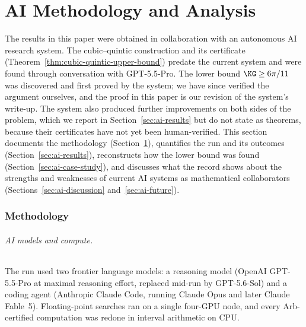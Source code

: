 

\hypersetup{
  colorlinks=true,
  linkcolor=blue!55!black,
  urlcolor=blue!55!black,
  citecolor=blue!55!black
}

\setlength{\parindent}{0pt}
\setlength{\parskip}{6pt}

\part{AI Methodology and Analysis}
\label{sec:ai}


The results in this paper were obtained in collaboration with an autonomous
AI research system. The cubic--quintic
construction and its certificate (Theorem~\ref{thm:cubic-quintic-upper-bound})
predate the current system and were found through conversation with GPT-5.5-Pro. The lower bound $\KG\ge6\pi/11$ was
discovered and first proved by the system; we have since verified the
argument ourselves, and the proof in this paper is our revision of the
system's write-up. The system also produced further improvements on both
sides of the problem, which we report in Section~\ref{sec:ai-results} but do
not state as theorems, because their certificates have not yet been human-verified. This section documents the methodology
(Section~\ref{sec:ai-methodology}), quantifies the run and its outcomes
(Section~\ref{sec:ai-results}), reconstructs how the lower bound was found
(Section~\ref{sec:ai-case-study}), and discusses what the record shows about
the strengths and weaknesses of current AI systems as mathematical
collaborators (Sections~\ref{sec:ai-discussion} and~\ref{sec:ai-future}).

\section{Methodology}
\label{sec:ai-methodology}

\paragraph{AI models and compute.}
The run used two frontier language models: a reasoning model (OpenAI
GPT-5.5-Pro at maximal reasoning effort, replaced mid-run by GPT-5.6-Sol)
and a coding agent (Anthropic Claude Code, running Claude Opus and later
Claude Fable~5). Floating-point searches
ran on a single four-GPU node, and every Arb-certified computation was redone in interval arithmetic on CPU.

